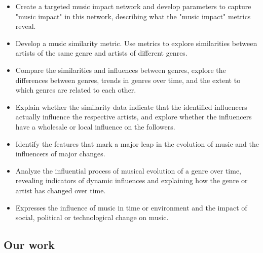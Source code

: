 \documentclass[12pt]{article}  %
\begin{document}
\begin{itemize}
	\setlength{\parsep}{0ex} %
	\setlength{\topsep}{2ex} %
	\setlength{\itemsep}{1ex} %
	\item Create a targeted music impact network and develop parameters to capture "music impact" in this network, describing what the "music impact" metrics reveal.
	\item Develop a music similarity metric. Use metrics to explore similarities between artists of the same genre and artists of different genres.
	\item Compare the similarities and influences between genres, explore the differences between genres, trends in genres over time, and the extent to which genres are related to each other.
	\item Explain whether the similarity data indicate that the identified influencers actually influence the respective artists, and explore whether the influencers have a wholesale or local influence on the followers.
	\item Identify the features that mark a major leap in the evolution of music and the influencers of major changes.
	\item Analyze the influential process of musical evolution of a genre over time, revealing indicators of dynamic influences and explaining how the genre or artist has changed over time.
	\item Expresses the influence of music in time or environment and the impact of social, political or technological change on music.
\end{itemize}

\subsection{Our work}
\end{document}
